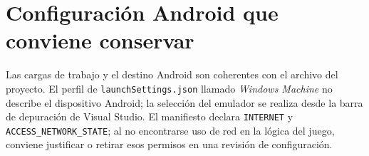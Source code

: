 \section{Configuración Android que conviene conservar}
Las cargas de trabajo y el destino Android son coherentes con el archivo del proyecto. El perfil de \texttt{launchSettings.json} llamado \emph{Windows Machine} no describe el dispositivo Android; la selección del emulador se realiza desde la barra de depuración de Visual Studio. El manifiesto declara \texttt{INTERNET} y \texttt{ACCESS\_NETWORK\_STATE}; al no encontrarse uso de red en la lógica del juego, conviene justificar o retirar esos permisos en una revisión de configuración.

